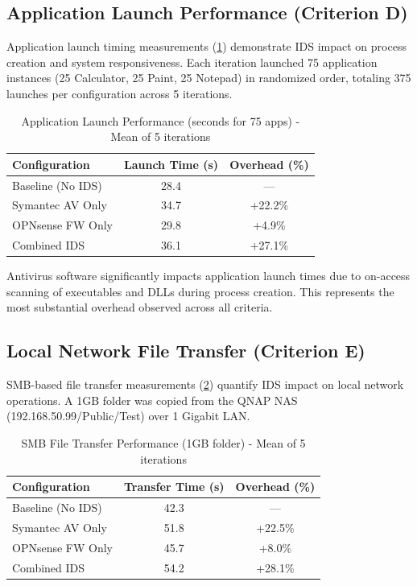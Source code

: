 \documentclass[runningheads,a4paper,english]{llncs}[2022/01/12]
\begin{document}
\subsection{Application Launch Performance (Criterion D)}

Application launch timing measurements (\cref{tab:applaunch}) demonstrate IDS impact on process creation and system responsiveness. Each iteration launched 75 application instances (25 Calculator, 25 Paint, 25 Notepad) in randomized order, totaling 375 launches per configuration across 5 iterations.

\begin{table}
  \caption{Application Launch Performance (seconds for 75 apps) - Mean of 5 iterations}
  \label{tab:applaunch}
  \centering
  \begin{tabular}{lcc}
    \toprule
    Configuration & Launch Time (s) & Overhead (\%) \\
    \midrule
    Baseline (No IDS) & 28.4 & --- \\
    Symantec AV Only & 34.7 & +22.2\% \\
    OPNsense FW Only & 29.8 & +4.9\% \\
    Combined IDS & 36.1 & +27.1\% \\
    \bottomrule
  \end{tabular}
\end{table}

Antivirus software significantly impacts application launch times due to on-access scanning of executables and DLLs during process creation. This represents the most substantial overhead observed across all criteria.

\subsection{Local Network File Transfer (Criterion E)}

SMB-based file transfer measurements (\cref{tab:smb}) quantify IDS impact on local network operations. A 1GB folder was copied from the QNAP NAS (192.168.50.99/Public/Test) over 1 Gigabit LAN.

\begin{table}
  \caption{SMB File Transfer Performance (1GB folder) - Mean of 5 iterations}
  \label{tab:smb}
  \centering
  \begin{tabular}{lcc}
    \toprule
    Configuration & Transfer Time (s) & Overhead (\%) \\
    \midrule
    Baseline (No IDS) & 42.3 & --- \\
    Symantec AV Only & 51.8 & +22.5\% \\
    OPNsense FW Only & 45.7 & +8.0\% \\
    Combined IDS & 54.2 & +28.1\% \\
    \bottomrule
  \end{tabular}
\end{table}
\end{document}
